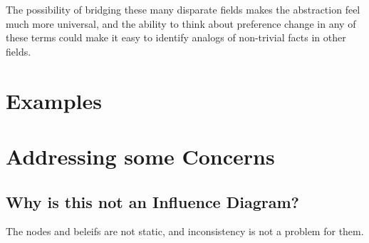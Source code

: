 \documentclass{article}
\begin{document}
	The possibility of bridging these many disparate fields makes the abstraction feel much more universal, and the ability to think about preference change in any of these terms could make it easy to identify analogs of non-trivial facts in other fields.
	
	
	

	

	
	\section{Examples}
	
	
	\section{Addressing some Concerns}
	
	\subsection{Why is this not an Influence Diagram?}
	The nodes and beleifs are not static, and inconsistency is not a problem for them. 
	
	
\end{document}
